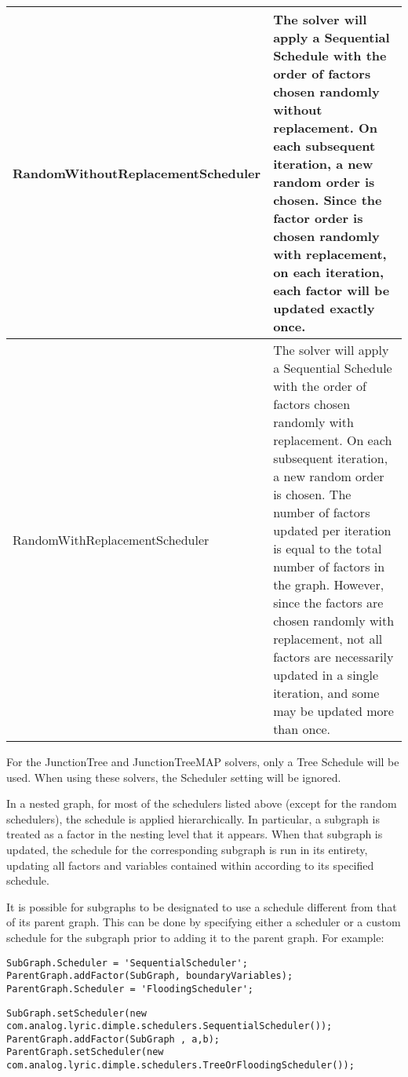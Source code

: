 \begin{longtable}{l p{4in}}
%
\textsf{RandomWithoutReplacementScheduler} & The solver will apply a Sequential Schedule with the order of factors chosen randomly without replacement.  On each subsequent iteration, a new random order is chosen.  Since the factor order is chosen randomly with replacement, on each iteration, each factor will be updated exactly once. \\ \hline
%
\textsf{RandomWithReplacementScheduler} & The solver will apply a Sequential Schedule with the order of factors chosen randomly with replacement.  On each subsequent iteration, a new random order is chosen.  The number of factors updated per iteration is equal to the total number of factors in the graph. However, since the factors are chosen randomly with replacement, not all factors are necessarily updated in a single iteration, and some may be updated more than once. \\ \hline
%
\end{longtable}

For the JunctionTree and JunctionTreeMAP solvers, only a Tree Schedule will be used.  When using these solvers, the Scheduler setting will be ignored.

In a nested graph, for most of the schedulers listed above (except for the random schedulers), the schedule is applied hierarchically.  In particular, a subgraph is treated as a factor in the nesting level that it appears.  When that subgraph is updated, the schedule for the corresponding subgraph is run in its entirety, updating all factors and variables contained within according to its specified schedule.

It is possible for subgraphs to be designated to use a schedule different from that of its parent graph.  This can be done by specifying either a scheduler or a custom schedule for the subgraph prior to adding it to the parent graph.  For example:

\ifmatlab
\begin{lstlisting}
SubGraph.Scheduler = 'SequentialScheduler';
ParentGraph.addFactor(SubGraph, boundaryVariables);
ParentGraph.Scheduler = 'FloodingScheduler';
\end{lstlisting}
\fi

\ifjava
\begin{lstlisting}
SubGraph.setScheduler(new com.analog.lyric.dimple.schedulers.SequentialScheduler()); 
ParentGraph.addFactor(SubGraph , a,b); 
ParentGraph.setScheduler(new com.analog.lyric.dimple.schedulers.TreeOrFloodingScheduler());		
\end{lstlisting}
\fi

